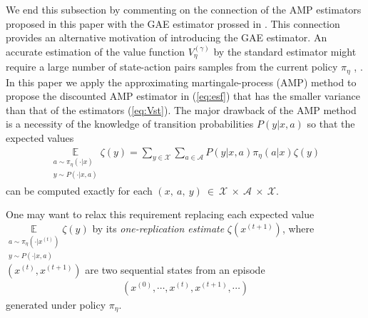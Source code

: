\documentclass[11pt]{article}
\newcommand{\E}{\mathbb{E}}
\newcommand{\X}{\mathcal{X}}
\newcommand{\A}{\mathcal{A}}
\theoremstyle{definition}
\numberwithin{equation}{section}
\begin{document}


We end this subsection by commenting on the connection of the AMP estimators proposed in this paper with the GAE estimator prossed in \cite{Schulman2016}. This connection provides an alternative motivation of introducing the GAE estimator.
An accurate estimation of the value function $V^{(\gamma)}_\eta$  by the standard estimator  might require  a large number of state-action pairs samples from the current policy $\pi_\eta$ \cite[Section 13]{Sutton2018}, \cite{Schulman2016, Ilyas2020}. In this paper we apply the approximating martingale-process (AMP) method to propose the discounted AMP estimator in (\ref{eq:esf}) that has  the smaller variance than that of the estimators   (\ref{eq:Vst}). %
  The major drawback of the AMP method is a necessity of the knowledge of transition probabilities $P(y|x, a)$ so that the  expected values    \begin{align*}\underset{\substack{ a\sim \pi_{\eta}(\cdot|x)  \\ y\sim P(\cdot|x, a)}}{\E}  \zeta(y) =  \sum\limits_{y\in \X} \sum\limits_{a\in \A}P(y|x , a)\pi_\eta(a|x )\zeta(y) \end{align*} can be computed exactly for each $(x,~a,~y)~\in~\X~\times~\A~\times~\X$.

One may want to relax this requirement replacing each expected value
 $\underset{\substack{ a\sim \pi_{\eta}\left(\cdot|x^{(t)}\right)  \\ y\sim P(\cdot|x, a)}}{\E}  \zeta(y)$  by its \textit{one-replication estimate}  $\zeta\left(x^{(t+1)}\right)$, where $\left(x^{(t)}, x^{(t+1)}\right)$ are two sequential states from an episode \begin{align*}
 \left(x^{(0)}, \cdots, x^{(t)}, x^{(t+1)}, \cdots\right)
 \end{align*} generated under policy $\pi_\eta$.
\end{document}
